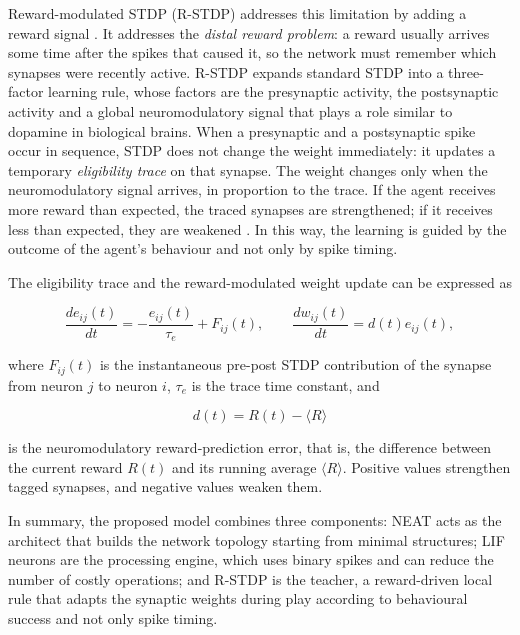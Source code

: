 Reward-modulated STDP (R-STDP) addresses this limitation by adding a reward signal \cite{mozafari2018,izhikevich2007,florian2007,legenstein2008,fremaux2016}. It addresses the \emph{distal reward problem}: a reward usually arrives some time after the spikes that caused it, so the network must remember which synapses were recently active. R-STDP expands standard STDP into a three-factor learning rule, whose factors are the presynaptic activity, the postsynaptic activity and a global neuromodulatory signal that plays a role similar to dopamine in biological brains. When a presynaptic and a postsynaptic spike occur in sequence, STDP does not change the weight immediately: it updates a temporary \emph{eligibility trace} on that synapse. The weight changes only when the neuromodulatory signal arrives, in proportion to the trace. If the agent receives more reward than expected, the traced synapses are strengthened; if it receives less than expected, they are weakened \cite{mozafari2018}. In this way, the learning is guided by the outcome of the agent's behaviour and not only by spike timing.

The eligibility trace and the reward-modulated weight update can be expressed as

\begin{equation}
    \frac{de_{ij}(t)}{dt} = -\frac{e_{ij}(t)}{\tau_e} + F_{ij}(t),
    \qquad
    \frac{dw_{ij}(t)}{dt} = d(t)e_{ij}(t),
\end{equation}

where $F_{ij}(t)$ is the instantaneous pre-post STDP contribution of the synapse from neuron $j$ to neuron $i$, $\tau_e$ is the trace time constant, and

\begin{equation}
    d(t) = R(t)-\langle R\rangle
\end{equation}

is the neuromodulatory reward-prediction error, that is, the difference between the current reward $R(t)$ and its running average $\langle R\rangle$. Positive values strengthen tagged synapses, and negative values weaken them.

In summary, the proposed model combines three components: NEAT acts as the architect that builds the network topology starting from minimal structures; LIF neurons are the processing engine, which uses binary spikes and can reduce the number of costly operations; and R-STDP is the teacher, a reward-driven local rule that adapts the synaptic weights during play according to behavioural success and not only spike timing.